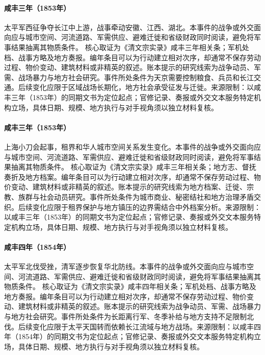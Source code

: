 \hypertarget{civic:EQ-1853-WESTERN-EXPEDITION}{}\paragraph{咸丰三年（1853年）}太平军西征争夺长江中上游，战事牵动安徽、江西、湖北。本事件的战争或外交面向应与城市空间、河流道路、军需供应、避难迁徙和省级财政同时阅读，避免将军事结果抽离其物质条件。 核心取证为《清文宗实录》咸丰三年相关条；军机处档、战事方略及地方奏报。编年条目可以为行动建立相对次序，却通常不保存劳动过程、物价变动、建筑材料或非精英的叙述。账本提示的研究线索为战争动员、军需、战场暴力与地方社会研究。事件所处条件为天京需要控制粮食、兵员和长江交通。后续变化应限于区域战场长期化，地方社会承受征发与迁徙。来源限制：以咸丰三年（1853年）的同期文书为定位起点；官修记录、奏报或外交文本服务特定机构立场，具体日期、规模、地方执行与对手视角须以独立材料复核。
\hypertarget{civic:EQ-1853-SMALL-SWORDS-SHANGHAI}{}\paragraph{咸丰三年（1853年）}上海小刀会起事，租界和华人城市空间关系发生变化。本事件的战争或外交面向应与城市空间、河流道路、军需供应、避难迁徙和省级财政同时阅读，避免将军事结果抽离其物质条件。 核心取证为《清文宗实录》咸丰三年相关条；地方志、督抚奏折及地方档案。编年条目可以为行动建立相对次序，却通常不保存劳动过程、物价变动、建筑材料或非精英的叙述。账本提示的研究线索为地方档案、迁徙、宗教、族群与社会动员研究。事件所处条件为城市商业、秘密结社和地方治理矛盾交织。后续变化应限于租界保护与地方镇压的边界需结合中外档案分析。来源限制：以咸丰三年（1853年）的同期文书为定位起点；官修记录、奏报或外交文本服务特定机构立场，具体日期、规模、地方执行与对手视角须以独立材料复核。
\hypertarget{civic:EQ-1854-TAIPING-NORTHERN-DEFEAT}{}\paragraph{咸丰四年（1854年）}太平军北伐受挫，清军逐步恢复华北防线。本事件的战争或外交面向应与城市空间、河流道路、军需供应、避难迁徙和省级财政同时阅读，避免将军事结果抽离其物质条件。 核心取证为《清文宗实录》咸丰四年相关条；军机处档、战事方略及地方奏报。编年条目可以为行动建立相对次序，却通常不保存劳动过程、物价变动、建筑材料或非精英的叙述。账本提示的研究线索为战争动员、军需、战场暴力与地方社会研究。事件所处条件为长距离行军、冬季补给与地方支持不足限制北伐。后续变化应限于太平天国转而依赖长江流域与地方战场。来源限制：以咸丰四年（1854年）的同期文书为定位起点；官修记录、奏报或外交文本服务特定机构立场，具体日期、规模、地方执行与对手视角须以独立材料复核。
